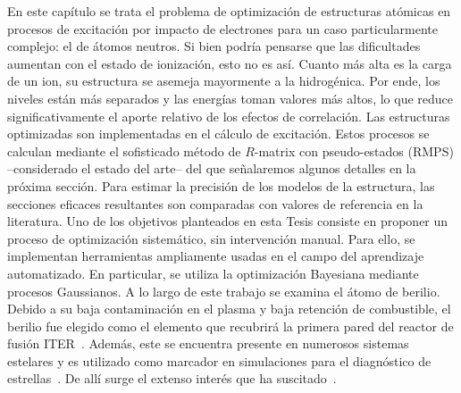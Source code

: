 En este capítulo se trata el problema de optimización de estructuras 
atómicas en procesos de excitación por impacto de electrones para un 
caso particularmente complejo: el de átomos neutros. Si bien podría 
pensarse que las dificultades aumentan con el estado de ionización, esto 
no es así. Cuanto más alta es la carga de un ion, su estructura se 
asemeja mayormente a la hidrogénica. Por ende, los niveles están más 
separados y las energías toman valores más altos, lo que reduce 
significativamente el aporte relativo de los efectos de correlación. 
Las estructuras optimizadas son implementadas en el cálculo de 
excitación. Estos procesos se calculan mediante el sofisticado método 
de $R$-matrix con pseudo-estados (RMPS) --considerado el estado del 
arte-- del que señalaremos algunos detalles en la próxima sección. 
Para estimar la precisión de los modelos de la estructura, las secciones 
eficaces resultantes son comparadas con valores de referencia en la 
literatura. Uno de los objetivos planteados en esta Tesis consiste en 
proponer un proceso de optimización sistemático, sin intervención 
manual. Para ello, se implementan herramientas ampliamente 
usadas en el campo del aprendizaje automatizado. En particular, se 
utiliza la optimización Bayesiana mediante procesos Gaussianos. 
A lo largo de este trabajo se examina el átomo de berilio. Debido a su 
baja contaminación en el plasma y baja retención de combustible, el 
berilio fue elegido como el elemento que recubrirá la primera pared del 
reactor de fusión ITER~\cite{Ikeda:07,Rubel:08}. Además, este se encuentra 
presente en numerosos sistemas estelares y es utilizado como marcador en 
simulaciones para el diagnóstico de estrellas~\cite{Deliyannis:00}. De 
allí surge el extenso interés que ha suscitado~\cite{Be_Ballance:03,
Bartschat:97,Colgan:03,Fursa:97,Bray:15,Zatsarinny:16,Blanco:17}. 


